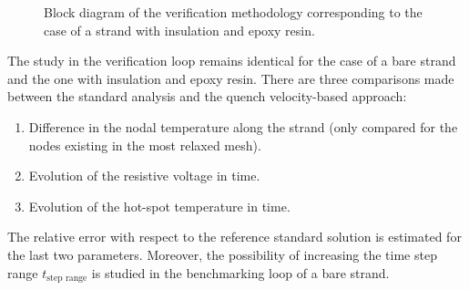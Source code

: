 \begin{figure}[H]
    \caption{Block diagram of the verification methodology corresponding to the case of a strand with insulation and epoxy resin.}
    \label{fig:block_diagram_benchmarking_methodology_with_insulation}
\end{figure}

The study in the verification loop remains identical for the case of a bare strand and the one with insulation and epoxy resin. There are three comparisons made between the standard analysis and the quench velocity-based approach: 
\begin{enumerate}
    \item Difference in the nodal temperature along the strand (only compared for the nodes existing in the most relaxed mesh).
    \item Evolution of the resistive voltage in time. 
    \item Evolution of the hot-spot temperature in time.
\end{enumerate}
The relative error with respect to the reference standard solution is estimated for the last two parameters. Moreover, the possibility of increasing the time step range $t_\text{step range}$ is studied in the benchmarking loop of a bare strand.